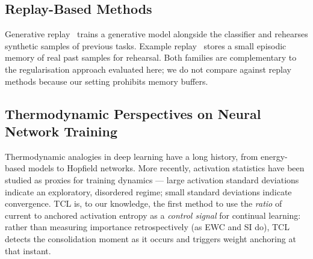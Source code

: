 \subsection{Replay-Based Methods}

Generative replay~\cite{Shin2017} trains a generative model alongside the
classifier and rehearses synthetic samples of previous tasks.
Example replay~\cite{Rebuffi2017} stores a small episodic memory of real past
samples for rehearsal.
Both families are complementary to the regularisation approach evaluated here; we
do not compare against replay methods because our setting prohibits memory buffers.

\subsection{Thermodynamic Perspectives on Neural Network Training}

Thermodynamic analogies in deep learning have a long history, from energy-based
models to Hopfield networks.
More recently, activation statistics have been studied as proxies for training
dynamics --- large activation standard deviations indicate an exploratory, disordered
regime; small standard deviations indicate convergence.
TCL is, to our knowledge, the first method to use the \emph{ratio} of current to
anchored activation entropy as a \emph{control signal} for continual learning: rather
than measuring importance retrospectively (as EWC and SI do), TCL detects the
consolidation moment as it occurs and triggers weight anchoring at that instant.
